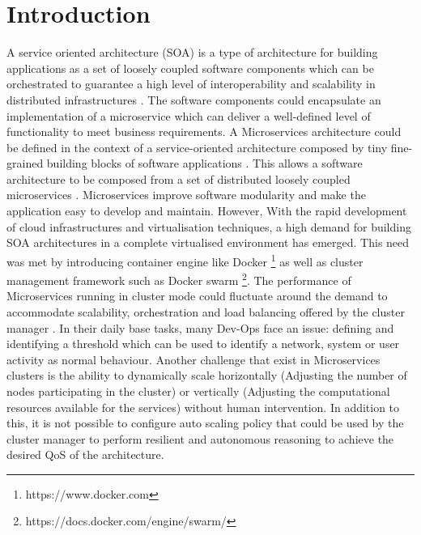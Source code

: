 \documentclass[sigconf]{acmart}
\begin{document}
\maketitle

%

 
 \section{Introduction}
A service oriented architecture (SOA) is a type of architecture for building applications as a set of loosely coupled software components which can be orchestrated to guarantee a high level of interoperability and scalability in distributed infrastructures 
\cite{erl2005service}. The software components could encapsulate an implementation of a microservice which can deliver a well-defined level of functionality to meet business requirements. A Microservices architecture could be defined in the context of a service-oriented architecture composed by tiny fine-grained building blocks of software applications \cite{stubbs2015distributed}. This allows a software architecture to be composed from a set of distributed loosely coupled microservices \cite{stubbs2015distributed}. Microservices improve software modularity and make the application easy to develop and maintain. However, With the rapid development of cloud infrastructures and virtualisation techniques, a high demand for building SOA architectures in a complete virtualised environment has emerged. This need was met by introducing container engine like Docker \footnote{https://www.docker.com} as well as cluster management framework such as Docker swarm \footnote{https://docs.docker.com/engine/swarm/}.  
The performance of Microservices running in cluster mode could fluctuate around the demand to accommodate scalability, orchestration and load balancing offered by the cluster manager \cite{stubbs2015distributed}. In their daily base tasks,  many Dev-Ops face an issue: defining and identifying a threshold which can be used to identify a network, system or user activity as normal behaviour. Another challenge that exist in Microservices clusters is the ability to dynamically scale horizontally (Adjusting the number of nodes participating in the cluster) or vertically (Adjusting the computational resources available for the services) without human intervention. In addition to this, it is not possible to configure auto scaling policy that could be used by the cluster manager to perform resilient and autonomous reasoning to achieve the desired QoS of the architecture. 
\end{document}
